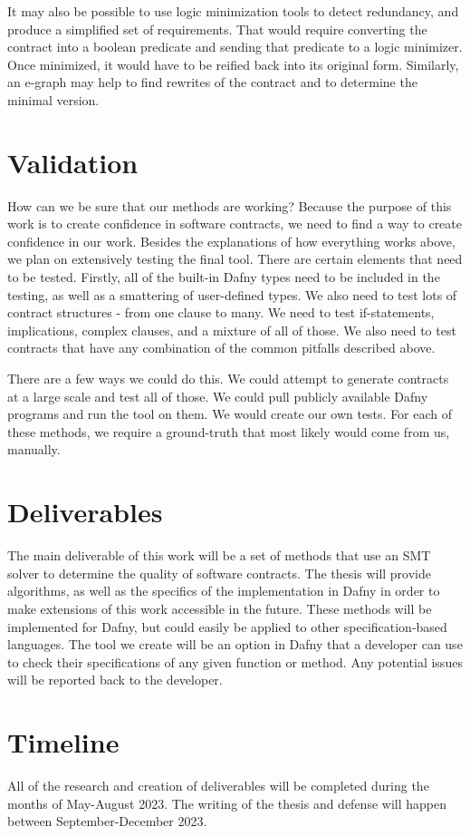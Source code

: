 \documentclass{article}
\begin{document}
It may also be possible to use logic minimization tools to detect redundancy, and produce a simplified set of requirements. That would require 
converting the contract into a boolean predicate and sending that predicate to a logic minimizer. Once minimized, it would have to be reified back 
into its original form. Similarly, an e-graph may help to find rewrites of the contract and to determine the minimal version. 

\section{Validation}

How can we be sure that our methods are working? Because the purpose of this work is to create confidence in software contracts, we need to find a way to create 
confidence in our work. Besides the explanations of how everything works above, we plan on extensively testing the final tool. There are certain elements 
that need to be tested. Firstly, all of the built-in Dafny types need to be included in the testing, as well as a smattering of user-defined types. 
We also need to test lots of contract structures - from one clause to many. We need to test if-statements, implications, complex clauses, and a mixture of 
all of those. We also need to test contracts that have any combination of the common pitfalls described above. 

There are a few ways we could do this. We could attempt to generate contracts at a large scale and test all of those. We could pull publicly available 
Dafny programs and run the tool on them. We would create our own tests. For each of these methods, we require a ground-truth that most likely would 
come from us, manually. 

\section{Deliverables}

The main deliverable of this work will be a set of methods that use an SMT solver to determine the quality of software
contracts. The thesis will provide algorithms, as well as the specifics of the implementation in Dafny in order to make
extensions of this work accessible in the future. These methods will be implemented for Dafny, but could easily be
applied to other specification-based languages. The tool we create will be an option in Dafny that a developer can
use to check their specifications of any given function or method. Any potential issues will be reported back to the
developer.

\section{Timeline}

All of the research and creation of deliverables will be completed during the months of May-August 2023. The writing of the thesis and defense will happen between September-December 2023.

% 
% 
% 

\end{document}
